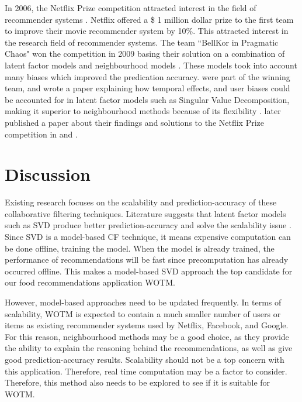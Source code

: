 In 2006, the Netflix Prize competition attracted interest in the field of recommender systems \cite{survey}. Netflix offered a \$ 1 million dollar prize to the first team to improve their movie recommender system by 10\%. This attracted interest in the research field of recommender systems. The team ``BellKor in Pragmatic Chaos" won the competition in 2009 basing their solution on a combination of latent factor models and neighbourhood models \cite{winning, survey}. These models took into account many biases which improved the predication accuracy. \citeauthor{koren2009matrix} were part of the winning team, and wrote a paper explaining how temporal effects, and user biases could be accounted for in latent factor models such as Singular Value Decomposition, making it superior to neighbourhood methods because of its flexibility \cite{koren2009matrix}. \citeauthor{koren2011} later published a paper about their findings and solutions to the Netflix Prize competition in \cite{koren2011} and \cite{winners}.

\section{Discussion}


Existing research focuses on the scalability and prediction-accuracy of these collaborative filtering techniques. Literature suggests that latent factor models such as SVD produce better prediction-accuracy and solve the scalability issue . Since SVD is a model-based CF technique, it means expensive computation can be done offline, training the model. When the model is already trained, the performance of recommendations will be fast  since precomputation has already occurred offline. This makes a model-based SVD approach the top candidate for our food recommendations application WOTM. 

However, model-based approaches need to be updated frequently. In terms of scalability, WOTM is expected to contain a much smaller number of users or items as existing recommender systems used by Netflix, Facebook, and Google. For this reason, neighbourhood methods may be a good choice, as they provide the ability to explain the reasoning behind the recommendations, as well as give good prediction-accuracy results. Scalability should not be a top concern with this application. Therefore, real time computation may be a factor to consider. Therefore, this method also needs to be explored to see if it is suitable for WOTM.

